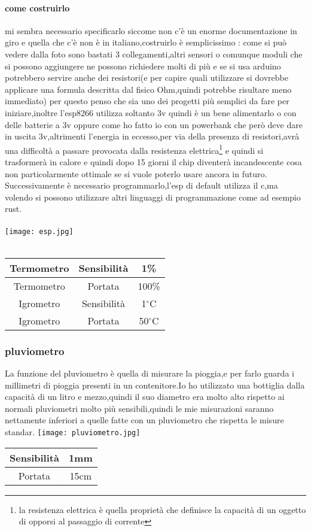 \documentclass[12pt]{article}
\begin{document}
\paragraph{come costruirlo}
mi sembra necessario specificarlo siccome non c'è un enorme documentazione in giro e quella che c'è non è in italiano,costruirlo è semplicissimo : come si può vedere dalla foto sono bastati 3 collegamenti,altri sensori o comunque moduli che si possono aggiungere ne possono richiedere molti di più e se si usa arduino potrebbero servire anche dei resistori(e per capire quali utilizzare si dovrebbe applicare una formula descritta dal fisico Ohm,quindi potrebbe risultare meno immediato) per questo penso che sia uno dei progetti più semplici da fare per iniziare,inoltre l'esp8266 utilizza soltanto 3v quindi è un bene alimentarlo o con delle batterie a 3v oppure come ho fatto io con un powerbank che però deve dare in uscita 3v,altrimenti l'energia in eccesso,per via della presenza di resistori,avrà una difficoltà a passare provocata dalla resistenza elettrica\footnote{la resistenza elettrica è quella proprietà che definisce la capacità di un oggetto di opporsi al passaggio di corrente} e quindi si trasformerà in calore e quindi dopo 15 giorni il chip diventerà incandescente cosa non particolarmente ottimale se si vuole poterlo usare ancora in futuro.\\
Successivamente è necessario programmarlo,l'esp di default utilizza il c,ma volendo si possono utilizzare altri linguaggi di programmazione come ad esempio rust.
\\ \\
    \texttt{[image: esp.jpg]} \\ \\
   \begin{tabular}{|c|c|S|}
    \hline
      Termometro & Sensibilità & 1\% \\
    \hline
   Termometro &  Portata &  100\% \\
    \hline
     Igrometro & Sensibilità & 1$^{\circ}$C \\
    \hline
    Igrometro & Portata & 50$^{\circ}$C\\
    \hline
\end{tabular}
\subsubsection{pluviometro}
La funzione del pluviometro è quella di misurare la pioggia,e per farlo guarda i millimetri di pioggia presenti in un contenitore.Io ho utilizzato una bottiglia dalla capacità di un litro e mezzo,quindi il suo diametro era molto alto rispetto ai normali pluviometri molto più sensibili,quindi le mie misurazioni saranno nettamente inferiori a quelle fatte con un pluviometro che rispetta le misure standar.
\texttt{[image: pluviometro.jpg]}
 \begin{tabular}{|c|S|}
    \hline
    Sensibilità & 1mm\\
    \hline
    Portata & 15cm\\
    \hline
\end{tabular}
\end{document}
